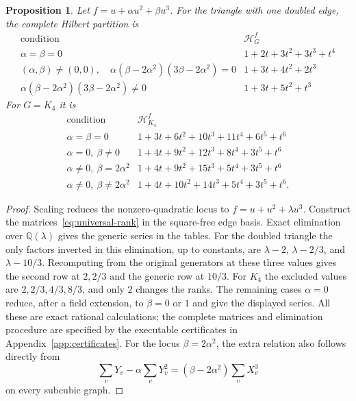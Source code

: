 \documentclass[reqno]{article}
\theoremstyle{plain} %
\newtheorem{proposition}[theorem]{Proposition}
\theoremstyle{definition}
\theoremstyle{remark}
\newcommand{\hs}{\mathscr{H}}
\numberwithin{equation}{section}
\begin{document}
\begin{proposition}\label{prop:small-parameter-strata}
Let $f=u+\alpha u^2+\beta u^3$.
For the triangle with one doubled edge, the complete Hilbert partition is
\[
\begin{array}{c|l}
\text{condition}&\hs_G^f\\\hline
\alpha=\beta=0&1+2t+3t^2+3t^3+t^4\\
(\alpha,\beta)\ne(0,0),\quad
 \alpha(\beta-2\alpha^2)(3\beta-2\alpha^2)=0
 &1+3t+4t^2+2t^3\\
\alpha(\beta-2\alpha^2)(3\beta-2\alpha^2)\ne0
 &1+3t+5t^2+t^3
\end{array}
\]
For $G=K_4$ it is
\[
\begin{array}{c|l}
\text{condition}&\hs_{K_4}^f\\\hline
\alpha=\beta=0&1+3t+6t^2+10t^3+11t^4+6t^5+t^6\\
\alpha=0,\ \beta\ne0&1+4t+9t^2+12t^3+8t^4+3t^5+t^6\\
\alpha\ne0,\ \beta=2\alpha^2&1+4t+9t^2+15t^3+5t^4+3t^5+t^6\\
\alpha\ne0,\ \beta\ne2\alpha^2&1+4t+10t^2+14t^3+5t^4+3t^5+t^6.
\end{array}
\]
\end{proposition}
\begin{proof}
Scaling reduces the nonzero-quadratic locus to
$f=u+u^2+\lambda u^3$. Construct the matrices~\eqref{eq:universal-rank}
in the square-free edge basis. Exact elimination over $\mathbb{Q}(\lambda)$
gives the generic series in the tables. For the doubled triangle the
only factors inverted in this elimination, up to constants, are
$\lambda-2$, $\lambda-2/3$, and $\lambda-10/3$.
Recomputing from the original generators at these three values gives
the second row at $2,2/3$ and the generic row at $10/3$.
For $K_4$ the excluded values are $2,2/3,4/3,8/3$, and only $2$
changes the ranks. The remaining cases $\alpha=0$ reduce, after a field
extension, to $\beta=0$ or $1$ and give the displayed series.
All these are exact rational calculations; the complete matrices and
elimination procedure are specified by the executable certificates in
Appendix~\ref{app:certificates}.
For the locus $\beta=2\alpha^2$, the extra relation also follows directly
from
\begin{equation}\label{eq:inverse-cubic-relation}
\sum_vY_v-\alpha\sum_vY_v^2
=(\beta-2\alpha^2)\sum_vX_v^3
\end{equation}
on every subcubic graph.
\end{proof}
\end{document}
